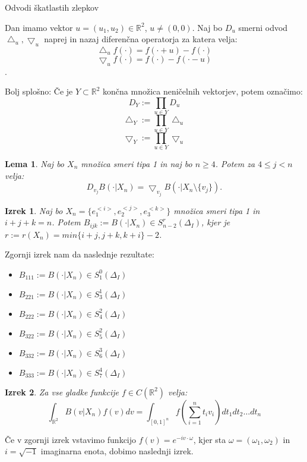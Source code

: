 \documentclass[12pt]{article}
\newtheorem{theorem}{Izrek}
\newtheorem{lemma}{Lema}
\begin{document}
Odvodi škatlastih zlepkov

Dan imamo vektor $u = (u_1, u_2) \in \mathbb{R}^2$, $u \neq (0,0)$.
Naj bo $D_u$ smerni odvod %
$\bigtriangleup_u, \bigtriangledown_u$ naprej in nazaj diferenčna operatorja %
za katera velja:
$$\bigtriangleup_u f(\cdot) = f(\cdot + u) - f(\cdot)$$
$$\bigtriangledown_u f(\cdot) = f(\cdot) - f(\cdot - u)$$.

Bolj splošno: Če je $Y \subset \mathbb{R}^2$ končna množica neničelnih vektorjev, potem označimo:
$$D_Y := \prod_{u \in Y} D_u$$
$$\bigtriangleup_Y := \prod_{u \in Y} \bigtriangleup_u$$
$$\bigtriangledown_Y := \prod_{u \in Y} \bigtriangledown_u$$

\begin{lemma}
\label{lema1}
Naj bo $X_n$ množica smeri tipa 1 in naj bo $n\geq 4$.
Potem za $4 \leq j < n$ velja:
$$D_{v_j} B(\cdot|X_n) = \bigtriangledown_{v_j} B(\cdot | X_n \setminus \{v_j\}).$$
\end{lemma}

\begin{theorem}
Naj bo $X_n = \{e_1^{<i>},e_2^{<j>}, e_3^{<k>}\}$ množica smeri tipa 1 in $i+j+k = n$.
Potem $B_{ijk} := B(\cdot | X_n) \in S_{n-2}^r (\Delta_I)$, kjer je $r := r(X_n) = min\{i+j, j+k, k+i\} -2$.
\end{theorem}

Zgornji izrek nam da naslednje rezultate:
\begin{itemize}
\item $B_{111} := B(\cdot | X_n) \in S_{1}^0 (\Delta_I)$
\item $B_{221} := B(\cdot | X_n) \in S_{3}^1 (\Delta_I)$
\item $B_{222} := B(\cdot | X_n) \in S_{4}^2 (\Delta_I)$
\item $B_{322} := B(\cdot | X_n) \in S_{5}^2 (\Delta_I)$
\item $B_{332} := B(\cdot | X_n) \in S_{6}^3 (\Delta_I)$
\item $B_{333} := B(\cdot | X_n) \in S_{7}^4 (\Delta_I)$
\end{itemize}

\begin{theorem}
Za vse gladke funkcije $f \in C(\mathbb{R}^2)$ velja:
$$\int_{\mathbb{R}^2} B(v|X_n) f(v) dv = \int_{[0,1]^n} f(\sum_{i=1}^n t_i v_i) dt_1 dt_2 \ldots dt_n$$
\end{theorem}

Če v zgornji izrek vstavimo funkcijo $f(v) = e^{-iv \cdot \omega }$, kjer sta $\omega = (\omega_1, \omega_2)$ in $i = \sqrt{-1}$ imaginarna enota, dobimo naslednji izrek.
\end{document}
